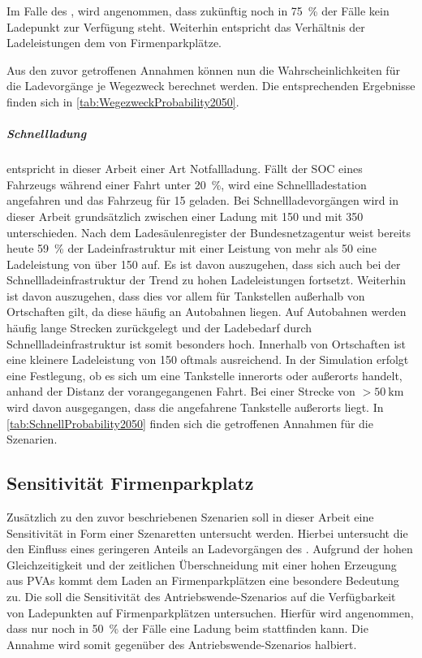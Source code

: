 Im Falle des \UCs \Straszenranddot, wird angenommen, dass zukünftig noch in \SI{75}{\percent} der Fälle kein Ladepunkt zur Verfügung steht.
Weiterhin entspricht das Verhältnis der Ladeleistungen dem von Firmenparkplätze.\medskip

Aus den zuvor getroffenen Annahmen können nun die Wahrscheinlichkeiten für die Ladevorgänge je Wegezweck berechnet werden.
Die entsprechenden Ergebnisse finden sich in \autoref{tab:WegezweckProbability2050}.




\subparagraph{Schnellladung} entspricht in dieser Arbeit einer Art Notfallladung.
Fällt der \gls{SOC} eines Fahrzeugs während einer Fahrt unter \SI{20}{\percent}, wird eine Schnellladestation angefahren und das Fahrzeug für \SI{15}{\Minuten} geladen.
Bei Schnellladevorgängen wird in dieser Arbeit grundsätzlich zwischen einer Ladung mit \SI{150}{\kw} und mit \SI{350}{\kw} unterschieden.
Nach dem Ladesäulenregister der Bundesnetzagentur \cite[][Stand: ]{BundesnetzagenturElektrizitaet2020} weist bereits heute \SI{59}{\percent} der Ladeinfrastruktur mit einer Leistung von mehr als \SI{50}{\kw} eine Ladeleistung von über \SI{150}{\kw} auf.
Es ist davon auszugehen, dass sich auch bei der Schnellladeinfrastruktur der Trend zu hohen Ladeleistungen fortsetzt.
Weiterhin ist davon auszugehen, dass dies vor allem für Tankstellen außerhalb von Ortschaften gilt, da diese häufig an Autobahnen liegen.
Auf Autobahnen werden häufig lange Strecken zurückgelegt und der Ladebedarf durch Schnellladeinfrastruktur ist somit besonders hoch.
Innerhalb von Ortschaften ist eine kleinere Ladeleistung von \SI{150}{\kw} oftmals ausreichend.
In der Simulation erfolgt eine Festlegung, ob es sich um eine Tankstelle innerorts oder außerorts handelt, anhand der Distanz der vorangegangenen Fahrt.
Bei einer Strecke von $> \SI{50}{\km}$ wird davon ausgegangen, dass die angefahrene Tankstelle außerorts liegt.
In \autoref{tab:SchnellProbability2050} finden sich die getroffenen Annahmen für die Szenarien.




\subsection{Sensitivität \glqq Firmenparkplatz\grqq}

Zusätzlich zu den zuvor beschriebenen Szenarien soll in dieser Arbeit eine Sensitivität in Form einer Szenaretten untersucht werden.
Hierbei untersucht die \SzeFirmenparkplatz den Einfluss eines geringeren Anteils an Ladevorgängen des \UC \Firmeparkplatz.
Aufgrund der hohen Gleichzeitigkeit und der zeitlichen Überschneidung mit einer hohen Erzeugung aus \glspl{PVA} kommt dem Laden an Firmenparkplätzen eine besondere Bedeutung zu.
Die \SzeFirmenparkplatz soll die Sensitivität des Antriebswende-Szenarios auf die Verfügbarkeit von Ladepunkten auf Firmenparkplätzen untersuchen.
Hierfür wird angenommen, dass nur noch in \SI{50}{\percent} der Fälle eine Ladung beim \UC \Firmeparkplatz stattfinden kann.
Die Annahme wird somit gegenüber des Antriebswende-Szenarios halbiert.

